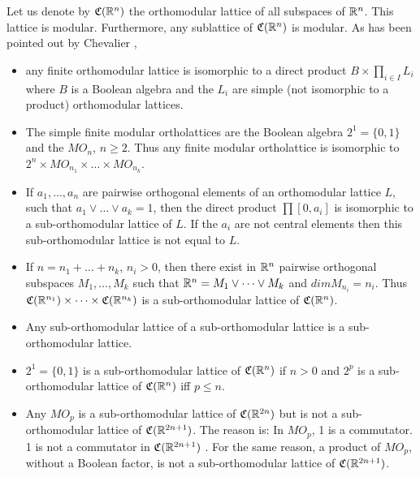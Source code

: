 \documentclass[%
  preprint,
 showpacs,
 showkeys,
 preprintnumbers,
 amsmath,amssymb,
 aps,
 rmp,
  longbibliography,
 ]{revtex4-1}
\begin{document}
Let us denote by ${\frak C} ({\Bbb R}^n)$ the orthomodular lattice of all
subspaces of
${\Bbb R}^n$. This
lattice is  modular. Furthermore, any sublattice  of  ${\frak C} ({\Bbb
R}^n)$
is modular. As has been pointed out by Chevalier \cite{cheval-priv},
\begin{itemize}

         \item  any finite orthomodular lattice is isomorphic to a
direct product $B
\times
        \displaystyle \prod_{i\in I}L_i$  where $B$ is a Boolean algebra and
         the  $L_i$ are simple (not isomorphic to a product)
orthomodular lattices.
        \item   The simple finite modular ortholattices are
the Boolean algebra
$2^1=\{0,1\}$
          and the $MO_n$, $n\geq 2$. Thus any finite modular
ortholattice is isomorphic to
        $2^n \times MO_{n_1}\times \dots\times MO_{n_k}$.
        \item  If $a_1,\dots, a_n$ are pairwise
        orthogonal elements of an orthomodular lattice
        $L$, such that   $a_1 \vee \dots \vee a_k =1$,
        then the direct product
         $\prod [0,a_i]$ is isomorphic to a sub-orthomodular lattice
        of $L$. If the $a_i$ are not central elements then this sub-orthomodular lattice is not
        equal to $L$.
         \item If $n= n_1 +\dots+n_k$, $n_i>0$, then there exist in
${\Bbb R}^n$
         pairwise orthogonal subspaces $M_1,\dots,M_k$ such that ${\Bbb
R}^n = M_1 \vee
          \dots \vee M_k$ and $dim M_{n_i} = n_i$. Thus ${\frak C}
({\Bbb R}^{n_1})\times
         \dots \times  {\frak C} ({\Bbb R}^{n_k})$ is a sub-orthomodular lattice of ${\frak C} ({\Bbb R}^n)$.
        \item  Any sub-orthomodular lattice of a  sub-orthomodular lattice is a sub-orthomodular lattice.
        \item  $2^1=\{0 ,1\}$ is a sub-orthomodular lattice
        of ${\frak C} ({\Bbb R}^n)$ if $n>0$ and $2^p $ is a
sub-orthomodular lattice of ${\frak C}
        ({\Bbb R}^n)$ iff $p\leq n$.
        \item  Any $MO_p$ is a sub-orthomodular lattice of ${\frak C} ({\Bbb R}^{2n})$ but is not a
         sub-orthomodular lattice of ${\frak C} ({\Bbb R}^{2n+1})$. The
reason is: In $MO_p$, 1 is a commutator. 1 is
        not a commutator in ${\frak C} ({\Bbb R}^{2n+1})$
\cite{cheval-or}.
 For
        the same reason, a product of $MO_p$, without a Boolean factor,  is not
        a sub-orthomodular lattice of ${\frak C} ({\Bbb R}^{2n+1})$.
\end{itemize}
\end{document}
